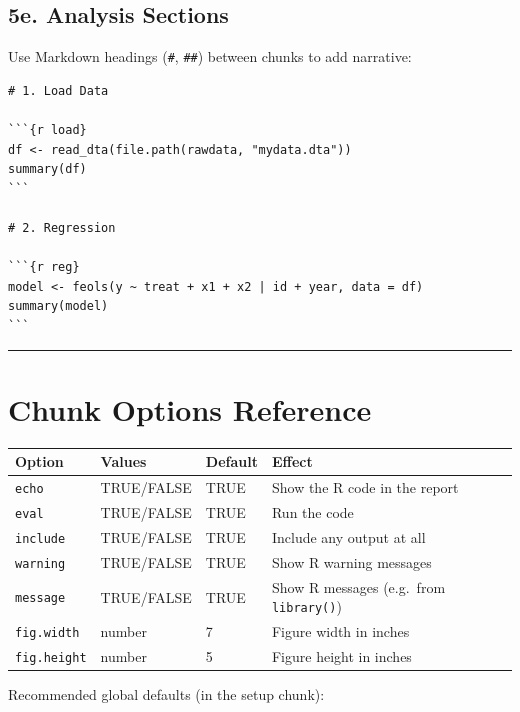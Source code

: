 \documentclass[paper=a4, fontsize=11pt]{scrartcl}
\newcommand{\horrule}[1]{\rule{\linewidth}{#1}}
\begin{document}
\subsection*{5e. Analysis Sections}

Use Markdown headings (\texttt{\#}, \texttt{\#\#}) between chunks to add narrative:

\begin{lstlisting}[style=yaml]
# 1. Load Data

```{r load}
df <- read_dta(file.path(rawdata, "mydata.dta"))
summary(df)
```

# 2. Regression

```{r reg}
model <- feols(y ~ treat + x1 + x2 | id + year, data = df)
summary(model)
```
\end{lstlisting}

\bigskip\horrule{0.4pt}\bigskip

\section{Chunk Options Reference}

\begin{center}
\begin{tabular}{lll p{6cm}}
\toprule
\textbf{Option} & \textbf{Values} & \textbf{Default} & \textbf{Effect} \\
\midrule
\texttt{echo}    & TRUE/FALSE & TRUE  & Show the R code in the report \\
\texttt{eval}    & TRUE/FALSE & TRUE  & Run the code \\
\texttt{include} & TRUE/FALSE & TRUE  & Include any output at all \\
\texttt{warning} & TRUE/FALSE & TRUE  & Show R warning messages \\
\texttt{message} & TRUE/FALSE & TRUE  & Show R messages (e.g.\ from \texttt{library()}) \\
\texttt{fig.width} & number & 7 & Figure width in inches \\
\texttt{fig.height} & number & 5 & Figure height in inches \\
\bottomrule
\end{tabular}
\end{center}

\medskip
Recommended global defaults (in the setup chunk):
\end{document}

